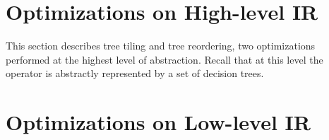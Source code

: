 \section{Optimizations on High-level IR}
\label{Sec:HIR}
This section describes tree tiling and tree reordering, two optimizations performed at the highest 
level of abstraction. Recall that at this level the  operator is abstractly
represented by a set of decision trees. 






\section{Optimizations on Low-level IR}
\label{Sec:LIR}


